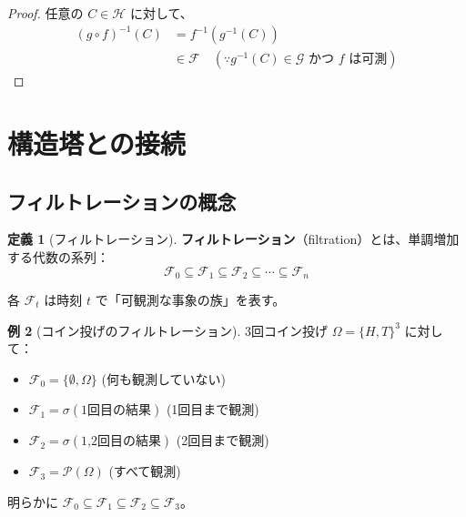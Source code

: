 \documentclass[12pt,a4paper,ja=standard]{bxjsarticle}
\theoremstyle{definition}
\newtheorem{definition}{定義}[section]
\newtheorem{example}[definition]{例}
\begin{document}
\begin{proof}
任意の $C \in \mathcal{H}$ に対して、
\begin{align*}
(g \circ f)^{-1}(C) &= f^{-1}(g^{-1}(C)) \\
&\in \mathcal{F} \quad (\because g^{-1}(C) \in \mathcal{G} \text{ かつ } f \text{ は可測})
\end{align*}
\end{proof}

\begin{center}
\end{center}

\section{構造塔との接続}\label{sec:connection}

\subsection{フィルトレーションの概念}

\begin{definition}[フィルトレーション]
\textbf{フィルトレーション}（filtration）とは、単調増加する代数の系列：
\[
\mathcal{F}_0 \subseteq \mathcal{F}_1 \subseteq \mathcal{F}_2 \subseteq \cdots \subseteq \mathcal{F}_n
\]

各 $\mathcal{F}_t$ は時刻 $t$ で「可観測な事象の族」を表す。
\end{definition}

\begin{example}[コイン投げのフィルトレーション]
3回コイン投げ $\Omega = \{H, T\}^3$ に対して：

\begin{itemize}
    \item $\mathcal{F}_0 = \{\emptyset, \Omega\}$ (何も観測していない)
    \item $\mathcal{F}_1 = \sigma(\text{1回目の結果})$ (1回目まで観測)
    \item $\mathcal{F}_2 = \sigma(\text{1,2回目の結果})$ (2回目まで観測)
    \item $\mathcal{F}_3 = \mathcal{P}(\Omega)$ (すべて観測)
\end{itemize}

明らかに $\mathcal{F}_0 \subseteq \mathcal{F}_1 \subseteq \mathcal{F}_2 \subseteq \mathcal{F}_3$。
\end{example}
\end{document}
